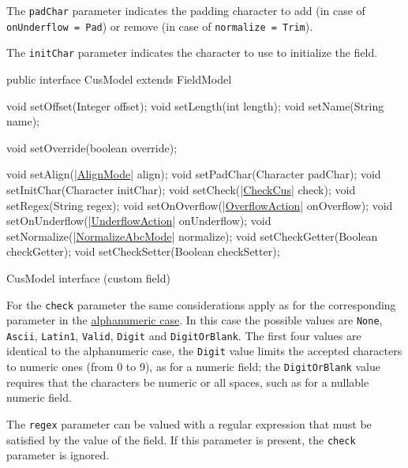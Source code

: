 \documentclass[a4paper,10pt]{report}
\newenvironment{elisting}[1][H]
  {\captionsetup{aboveskip=0pt}\begin{listing}[#1]}
  {\end{listing}%
}
\begin{document}
The \verb!padChar! parameter indicates the padding character to add (in case of 
\texttt{onUnderflow = Pad}) or remove (in case of \texttt{normalize = Trim}). 

The \verb!initChar! parameter indicates the character to use to initialize the 
field.

\begin{elisting}[!htb]
\begin{javacode}
public interface CusModel extends FieldModel {
    void setOffset(Integer offset);
    void setLength(int length);
    void setName(String name);
    
    void setOverride(boolean override);
    
    void setAlign(|\hyperref[lst:AlignMode]{AlignMode}| align);
    void setPadChar(Character padChar);
    void setInitChar(Character initChar);
    void setCheck(|\hyperref[lst:CheckCus]{CheckCus}| check);
    void setRegex(String regex);
    void setOnOverflow(|\hyperref[lst:OverflowAction]{OverflowAction}| onOverflow);
    void setOnUnderflow(|\hyperref[lst:UnderflowAction]{UnderflowAction}| onUnderflow);
    void setNormalize(|\hyperref[lst:NormalizeAbcMode]{NormalizeAbcMode}| normalize);
    void setCheckGetter(Boolean checkGetter);
    void setCheckSetter(Boolean checkSetter);
}
\end{javacode}
\caption{CusModel interface (custom field)}
\label{lst:CusModel}
\end{elisting}

For the \verb!check! parameter the same considerations apply as for the 
corresponding parameter in the \hyperlink{abc:chk}{alphanumeric case}. 
In this case the possible values are \verb!None!, \verb!Ascii!, \verb!Latin1!, 
\verb!Valid!, \verb!Digit! and \verb!DigitOrBlank!. 
The first four values are identical to the alphanumeric case, the \verb!Digit! 
value limits the accepted characters to numeric ones (from 0 to 9), as for a 
numeric field; the \verb!DigitOrBlank! value requires that the characters be 
numeric or all spaces, such as for a nullable numeric field.

The \verb!regex! parameter can be valued with a regular expression that must be 
satisfied by the value of the field. If this parameter is present, the 
\verb!check! parameter is ignored.
\end{document}
